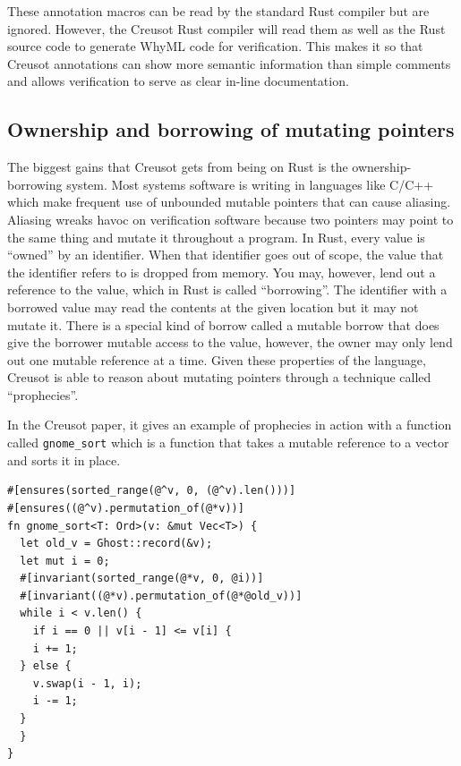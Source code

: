 \documentclass[12pt]{article}
\begin{document}
These annotation macros can be read by the standard Rust compiler but are ignored.
However, the Creusot Rust compiler will read them as well as the Rust source code to generate WhyML code for verification.
This makes it so that Creusot annotations can show more semantic information than simple comments and allows verification to serve as clear in-line documentation.

\subsection{Ownership and borrowing of mutating pointers}
The biggest gains that Creusot gets from being on Rust is the ownership-borrowing system.
Most systems software is writing in languages like C/C++ which make frequent use of unbounded mutable pointers that can cause aliasing.
Aliasing wreaks havoc on verification software because two pointers may point to the same thing and mutate it throughout a program.
In Rust, every value is ``owned'' by an identifier. When that identifier goes out of scope, the value that the identifier refers to is dropped from memory.
You may, however, lend out a reference to the value, which in Rust is called ``borrowing''.
The identifier with a borrowed value may read the contents at the given location but it may not mutate it.
There is a special kind of borrow called a mutable borrow that does give the borrower mutable access to the value, however, the owner may only lend out one mutable reference at a time.
Given these properties of the language, Creusot is able to reason about mutating pointers through a technique called ``prophecies''.

In the Creusot paper, it gives an example of prophecies in action with a function called \texttt{gnome\_sort} which is a function that takes a mutable reference to a vector and sorts it in place.

\begin{verbatim}
#[ensures(sorted_range(@^v, 0, (@^v).len()))]
#[ensures((@^v).permutation_of(@*v))]
fn gnome_sort<T: Ord>(v: &mut Vec<T>) {
  let old_v = Ghost::record(&v);
  let mut i = 0;
  #[invariant(sorted_range(@*v, 0, @i))]
  #[invariant((@*v).permutation_of(@*@old_v))]
  while i < v.len() {
    if i == 0 || v[i - 1] <= v[i] {
    i += 1;
  } else {
    v.swap(i - 1, i);
    i -= 1;
  }
  }
}
\end{verbatim}
\end{document}
